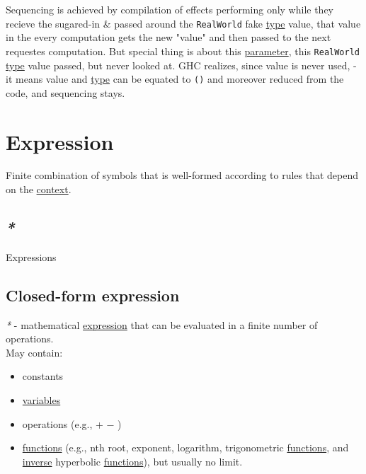 \documentclass[a4paper,14pt,oneside]{book}
\begin{document}
Sequencing is achieved by compilation of effects performing only while they recieve the sugared-in \& passed around the \texttt{RealWorld} fake \hyperref[org258d25a]{type} value, that value in the every computation gets the new "value" and then passed to the next requestes computation. But special thing is about this \hyperref[org65aaf9b]{parameter}, this \texttt{RealWorld} \hyperref[org258d25a]{type} value passed, but never looked at. GHC realizes, since value is never used, - it means value and \hyperref[org258d25a]{type} can be equated to \texttt{()} and moreover reduced from the code, and sequencing stays.\\

\chapter{\label{org70841e3}Expression}
\label{sec:org8555328}
Finite combination of symbols that is well-formed according to rules that depend on the \hyperref[org5afd675]{context}.\\

\section{\emph{*}}
\label{sec:org0ebb3c5}

\label{org1b8f832}Expressions\\

\section{\label{org2450c02}Closed-form expression}
\label{sec:org86af177}
\emph{*} - mathematical \hyperref[org70841e3]{expression} that can be evaluated in a finite number of operations.\\

May contain:\\
\begin{itemize}
\item constants\\
\item \hyperref[org4277fa3]{variables}\\
\item operations (e.g., + − \texttimes{} \textdiv{})\\
\item \hyperref[orgad455e4]{functions} (e.g., nth root, exponent, logarithm, trigonometric \hyperref[orgad455e4]{functions}, and \hyperref[orgf468f42]{inverse} hyperbolic \hyperref[orgad455e4]{functions}), but usually no limit.\\
\end{itemize}
\end{document}
